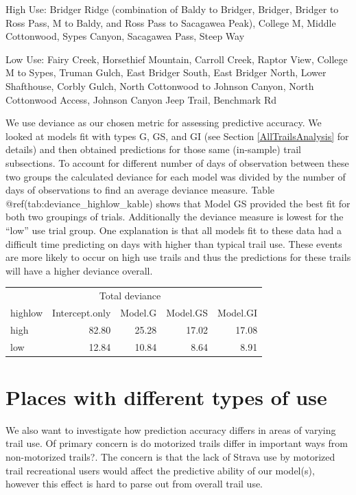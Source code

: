 \documentclass[
]{book}
\begin{document}
High Use: Bridger Ridge (combination of Baldy to Bridger, Bridger, Bridger to Ross Pass, M to Baldy, and Ross Pass to Sacagawea Peak), College M, Middle Cottonwood, Sypes Canyon, Sacagawea Pass, Steep Way

Low Use: Fairy Creek, Horsethief Mountain, Carroll Creek, Raptor View, College M to Sypes, Truman Gulch, East Bridger South, East Bridger North, Lower Shafthouse, Corbly Gulch, North Cottonwood to Johnson Canyon, North Cottonwood Access, Johnson Canyon Jeep Trail, Benchmark Rd

We use deviance as our chosen metric for assessing predictive accuracy. We looked at models fit with types G, GS, and GI (see Section \ref{AllTrailsAnalysis} for details) and then obtained predictions for those same (in-sample) trail subsections. To account for different number of days of observation between these two groups the calculated deviance for each model was divided by the number of days of observations to find an average deviance measure. Table @ref(tab:deviance\_highlow\_kable) shows that Model GS provided the best fit for both two groupings of trials. Additionally the deviance measure is lowest for the ``low'' use trial group. One explanation is that all models fit to these data had a difficult time predicting on days with higher than typical trail use. These events are more likely to occur on high use trails and thus the predictions for these trails will have a higher deviance overall.

\begin{table}
\centering
\begin{tabular}{lrrrr}
\toprule
\multicolumn{1}{c}{ } & \multicolumn{3}{c}{Total deviance} \\
\cmidrule(l{3pt}r{3pt}){2-4}
highlow & Intercept.only & Model.G & Model.GS & Model.GI\\
\midrule
high & 82.80 & 25.28 & 17.02 & 17.08\\
low & 12.84 & 10.84 & 8.64 & 8.91\\
\bottomrule
\end{tabular}
\end{table}

\hypertarget{places-with-different-types-of-use}{%
\section{Places with different types of use}\label{places-with-different-types-of-use}}

We also want to investigate how prediction accuracy differs in areas of varying trail use. Of primary concern is do motorized trails differ in important ways from non-motorized trails?. The concern is that the lack of Strava use by motorized trail recreational users would affect the predictive ability of our model(s), however this effect is hard to parse out from overall trail use.
\end{document}
